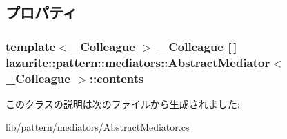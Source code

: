 \subsection{プロパティ}
\hypertarget{classlazurite_1_1pattern_1_1mediators_1_1_abstract_mediator_3_01___colleague_01_4_a7e12a0e1943ab3f66a6acc49b54006ad}{
\subsubsection[{contents}]{\setlength{\rightskip}{0pt plus 5cm}template$<$\_\-Colleague $>$ \_\-Colleague \mbox{[}$\,$\mbox{]} lazurite::pattern::mediators::AbstractMediator$<$ \_\-Colleague $>$::contents}}
\label{classlazurite_1_1pattern_1_1mediators_1_1_abstract_mediator_3_01___colleague_01_4_a7e12a0e1943ab3f66a6acc49b54006ad}


このクラスの説明は次のファイルから生成されました:\begin{DoxyCompactItemize}
\item 
lib/pattern/mediators/AbstractMediator.cs\end{DoxyCompactItemize}
